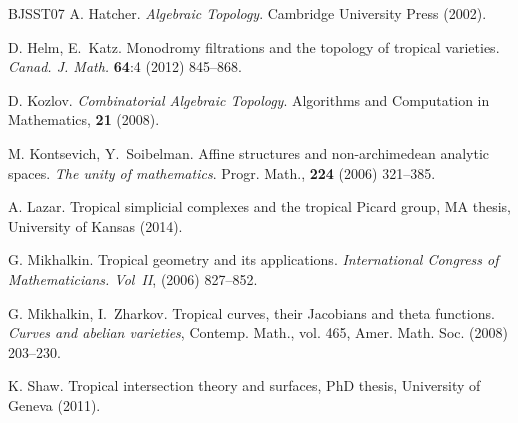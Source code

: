 \documentclass[11pt]{amsart}
\theoremstyle{definition}
\begin{document}
\begin{thebibliography}{BJSST07}
A. Hatcher. \textit{Algebraic Topology}. Cambridge
University Press (2002).

D. Helm, E.~Katz.
Monodromy filtrations and the topology of tropical varieties.
\textit{Canad. J. Math.} \textbf{64}:4 (2012) 845--868.

D. Kozlov.
\textit{Combinatorial Algebraic Topology}.
Algorithms and Computation in Mathematics, \textbf{21} (2008).

M. Kontsevich, Y.~Soibelman.
Affine structures and non-archimedean analytic spaces.
\textit{The unity of mathematics}. Progr. Math., \textbf{224} (2006) 321--385.

A. Lazar.
Tropical simplicial complexes and the tropical Picard group,
MA thesis, University of Kansas (2014).

G. Mikhalkin. Tropical geometry and its applications.
\textit{International Congress of Mathematicians. Vol~II}, (2006) 827--852.

G. Mikhalkin, I.~Zharkov.
Tropical curves,
their Jacobians and theta functions. \textit{Curves and abelian varieties},
Contemp. Math., vol. 465, Amer. Math. Soc. (2008) 203--230.

K. Shaw.
Tropical intersection theory and surfaces,
PhD thesis, University of Geneva (2011).

\end{thebibliography}
\end{document}
